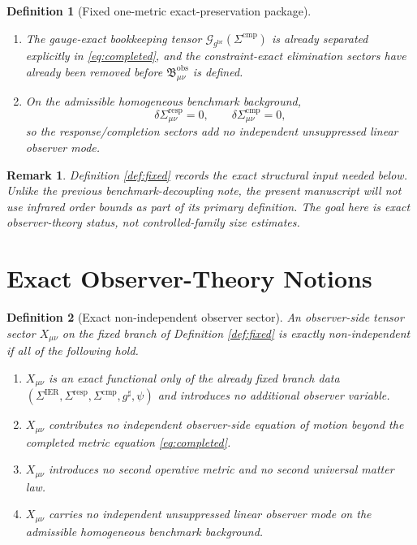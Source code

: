 \documentclass[11pt]{article}
\newcommand{\ObserverMetric}{g^{\mathrm{br}}}
\newcommand{\CompletedMetric}{g^{\sharp}}
\newcommand{\BaseShift}{\Sigma^{\mathrm{IER}}}
\newcommand{\ResponseShift}{\Sigma^{\mathrm{resp}}}
\newcommand{\CompShift}{\Sigma^{\mathrm{cmp}}}
\newcommand{\ResidualDec}{\mathcal D_{\mu\nu}^{\mathrm{res}}}
\newcommand{\MixQuad}{\mathcal M_{\mu\nu}^{\mathrm{mix}}}
\newcommand{\RespQuad}{\mathcal Q_{\mu\nu}^{\mathrm{resp}}}
\newcommand{\DeltaTCand}{\Delta T_{\mu\nu}^{\mathrm{cand}}}
\newcommand{\GaugeBook}{\mathcal G_{\ObserverMetric}}
\newcommand{\ObsBurden}{\mathfrak B_{\mu\nu}^{\mathrm{obs}}}
\newtheorem{definition}{Definition}
\newtheorem{remark}{Remark}
\begin{document}
\begin{definition}[Fixed one-metric exact-preservation package]
\begin{enumerate}
\begin{equation}
    \ResidualDec
    =
    \MixQuad+\RespQuad-8\pi G_N\,\DeltaTCand,
    \label{eq:resdec}
    \end{equation}
    where \(\MixQuad\) is bilinear in \(\BaseShift\) and \(\ResponseShift\), \(\RespQuad\) is at least quadratic in \(\ResponseShift\), and \(\DeltaTCand\) is the candidate-branch same-metric matter re-expansion term.
    \item The gauge-exact bookkeeping tensor \(\GaugeBook(\CompShift)\) is already separated explicitly in \eqref{eq:completed}, and the constraint-exact elimination sectors have already been removed before \(\ObsBurden\) is defined.
    \item On the admissible homogeneous benchmark background,
    \begin{equation}
    \delta\ResponseShift_{\mu\nu}=0,
    \qquad
    \delta\CompShift_{\mu\nu}=0,
    \label{eq:linearzero}
    \end{equation}
    so the response/completion sectors add no independent unsuppressed linear observer mode.
\end{enumerate}
\end{definition}

\begin{remark}
Definition \ref{def:fixed} records the exact structural input needed below. Unlike the previous benchmark-decoupling note, the present manuscript will not use infrared order bounds as part of its primary definition. The goal here is exact observer-theory status, not controlled-family size estimates.
\end{remark}

\section{Exact Observer-Theory Notions}

\begin{definition}[Exact non-independent observer sector]
\label{def:nonind}
An observer-side tensor sector \(X_{\mu\nu}\) on the fixed branch of Definition \ref{def:fixed} is \emph{exactly non-independent} if all of the following hold.
\begin{enumerate}
    \item \(X_{\mu\nu}\) is an exact functional only of the already fixed branch data \((\BaseShift,\ResponseShift,\CompShift,\CompletedMetric,\psi)\) and introduces no additional observer variable.
    \item \(X_{\mu\nu}\) contributes no independent observer-side equation of motion beyond the completed metric equation \eqref{eq:completed}.
    \item \(X_{\mu\nu}\) introduces no second operative metric and no second universal matter law.
    \item \(X_{\mu\nu}\) carries no independent unsuppressed linear observer mode on the admissible homogeneous benchmark background.
\end{enumerate}
\end{definition}
\end{document}
